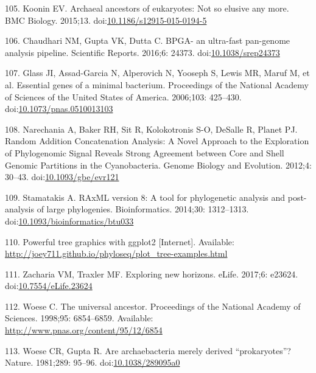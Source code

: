 \documentclass[12pt,twoside]{reedthesis}
\begin{document}
  \hypertarget{ref-kooninux5farchaealux5f2015}{}
  105. Koonin EV. Archaeal ancestors of eukaryotes: Not so elusive any
  more. BMC Biology. 2015;13.
  doi:\href{https://doi.org/10.1186/s12915-015-0194-5}{10.1186/s12915-015-0194-5}
  
  \hypertarget{ref-chaudhariux5fbpga-ux5f2016}{}
  106. Chaudhari NM, Gupta VK, Dutta C. BPGA- an ultra-fast pan-genome
  analysis pipeline. Scientific Reports. 2016;6: 24373.
  doi:\href{https://doi.org/10.1038/srep24373}{10.1038/srep24373}
  
  \hypertarget{ref-glassux5fessentialux5f2006}{}
  107. Glass JI, Assad-Garcia N, Alperovich N, Yooseph S, Lewis MR, Maruf
  M, et al. Essential genes of a minimal bacterium. Proceedings of the
  National Academy of Sciences of the United States of America. 2006;103:
  425--430.
  doi:\href{https://doi.org/10.1073/pnas.0510013103}{10.1073/pnas.0510013103}
  
  \hypertarget{ref-narechaniaux5frandomux5f2012}{}
  108. Narechania A, Baker RH, Sit R, Kolokotronis S-O, DeSalle R, Planet
  PJ. Random Addition Concatenation Analysis: A Novel Approach to the
  Exploration of Phylogenomic Signal Reveals Strong Agreement between Core
  and Shell Genomic Partitions in the Cyanobacteria. Genome Biology and
  Evolution. 2012;4: 30--43.
  doi:\href{https://doi.org/10.1093/gbe/evr121}{10.1093/gbe/evr121}
  
  \hypertarget{ref-stamatakisux5fraxmlux5f2014}{}
  109. Stamatakis A. RAxML version 8: A tool for phylogenetic analysis and
  post-analysis of large phylogenies. Bioinformatics. 2014;30: 1312--1313.
  doi:\href{https://doi.org/10.1093/bioinformatics/btu033}{10.1093/bioinformatics/btu033}
  
  \hypertarget{ref-phylosequx5fpowerfulux5f2016}{}
  110. Powerful tree graphics with ggplot2 {[}Internet{]}. Available:
  \url{http://joey711.github.io/phyloseq/plot_tree-examples.html}
  
  \hypertarget{ref-zachariaux5fexploringux5f2017}{}
  111. Zacharia VM, Traxler MF. Exploring new horizons. eLife. 2017;6:
  e23624.
  doi:\href{https://doi.org/10.7554/eLife.23624}{10.7554/eLife.23624}
  
  \hypertarget{ref-woeseux5funiversalux5f1998}{}
  112. Woese C. The universal ancestor. Proceedings of the National
  Academy of Sciences. 1998;95: 6854--6859. Available:
  \url{http://www.pnas.org/content/95/12/6854}
  
  \hypertarget{ref-woeseux5fareux5f1981}{}
  113. Woese CR, Gupta R. Are archaebacteria merely derived
  ``prokaryotes''? Nature. 1981;289: 95--96.
  doi:\href{https://doi.org/10.1038/289095a0}{10.1038/289095a0}
  
\end{document}
